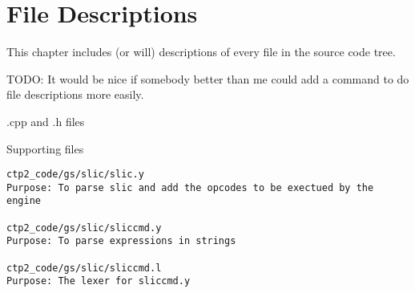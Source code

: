 \chapter{File Descriptions\label{cha:filedescribe}}

This chapter includes (or will) descriptions of every file in the source code tree. 

TODO: It would be nice if somebody better than me could add a command to do file descriptions more easily.

\begin{section}{.cpp and .h files}

\end{section}

\begin{section}{Supporting files}

\begin{verbatim}
ctp2_code/gs/slic/slic.y
Purpose: To parse slic and add the opcodes to be exectued by the engine

ctp2_code/gs/slic/sliccmd.y
Purpose: To parse expressions in strings

ctp2_code/gs/slic/sliccmd.l
Purpose: The lexer for sliccmd.y
\end{verbatim}

\end{section}